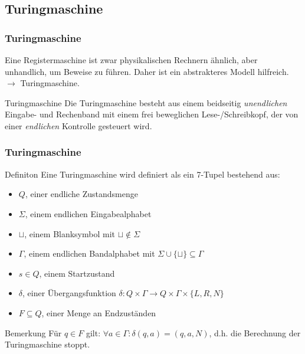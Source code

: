 \subsection{Turingmaschine}
\begin{frame}
\frametitle{Turingmaschine}
Eine Registermaschine ist zwar physikalischen Rechnern ähnlich, aber unhandlich, um Beweise zu führen.
Daher ist ein abstrakteres Modell hilfreich. \\
$\rightarrow$ Turingmaschine.
\pause
\begin{block}{Turingmaschine}
Die Turingmaschine besteht aus einem beidseitig \emph{unendlichen} Eingabe- und Rechenband
mit einem frei beweglichen Lese-/Schreibkopf, der von einer \emph{endlichen} Kontrolle gesteuert wird. 
\end{block}

\begin{center}
\end{center}
\end{frame}
\begin{frame}
\frametitle{Turingmaschine}
\begin{block}{Definiton}
Eine Turingmaschine wird definiert als ein 7-Tupel bestehend aus:
 \begin{itemize}
 \item $Q$, einer endliche Zustandsmenge
 \item $\Sigma$, einem endlichen Eingabealphabet
 \item $\sqcup$, einem Blanksymbol mit $\sqcup \notin \Sigma$
 \item $\Gamma$, einem endlichen Bandalphabet mit $\Sigma \cup\{\sqcup\} \subseteq \Gamma$
 \item $s \in Q$, einem Startzustand
 \item $\delta$, einer Übergangsfunktion $\delta: Q\times\Gamma \rightarrow Q\times\Gamma\times\{L, R, N\}$
 \item $F \subseteq Q$, einer Menge an Endzuständen
 \end{itemize}
\end{block}
\begin{block}{Bemerkung}
 Für $q\in F$ gilt: $\forall a \in \Gamma: \delta(q, a) = (q, a, N)$, d.h. die Berechnung der Turingmaschine stoppt.
\end{block}
\end{frame}

